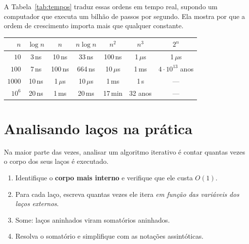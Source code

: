 A Tabela~\ref{tab:tempos} traduz essas ordens em tempo real, supondo um computador que executa um bilhão de passos por segundo. Ela mostra por que a ordem de crescimento importa mais que qualquer constante.
\begin{figura}
\captionsetup{type=table}\caption{Tempo para executar $f(n)$ passos a $10^9$ passos por segundo.}\label{tab:tempos}
\small
\begin{tabular}{@{}rcccccc@{}}
\toprule
$n$ & $\log n$ & $n$ & $n\log n$ & $n^2$ & $n^3$ & $2^n$\\
\midrule
$10$ & 3\,ns & 10\,ns & 33\,ns & 100\,ns & 1\,$\mu$s & 1\,$\mu$s\\
$100$ & 7\,ns & 100\,ns & 664\,ns & 10\,$\mu$s & 1\,ms & $4\cdot10^{13}$ anos\\
$1000$ & 10\,ns & 1\,$\mu$s & 10\,$\mu$s & 1\,ms & 1\,s & ---\\
$10^6$ & 20\,ns & 1\,ms & 20\,ms & 17\,min & 32 anos & ---\\
\bottomrule
\end{tabular}
\end{figura}

\section{Analisando laços na prática}\label{sec:lacos}
Na maior parte das vezes, analisar um algoritmo iterativo é contar quantas vezes o corpo dos seus laços é executado.

\begin{roteiro}
\begin{enumerate}
  \item Identifique o \textbf{corpo mais interno} e verifique que ele custa $O(1)$.
  \item Para cada laço, escreva quantas vezes ele itera \emph{em função das variáveis dos laços externos}.
  \item Some: laços aninhados viram somatórios aninhados.
  \item Resolva o somatório e simplifique com as notações assintóticas.
\end{enumerate}
\end{roteiro}

